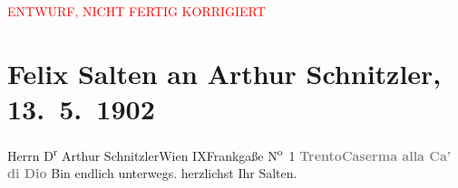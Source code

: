 
\begin{center}
            \textcolor{red}{ENTWURF, NICHT FERTIG KORRIGIERT}
                      \end{center}
            
         \renewcommand{\erwaehnteOrte}{Orte: Frankgasse, IX., Alsergrund, Kaserne Ca’ di Dio, Trient, Wien}
         \renewcommand{\erwaehnteWerke}{}
               \section[Felix Salten an Arthur Schnitzler, 13. 5. 1902]{ Felix Salten an Arthur Schnitzler, 13. 5. 1902}\nopagebreak{}\rehead{ }\begin{ledgroupsized}[t]{13cm}\normalsize\beginnumbering \toendnotes[C]{\smallbreak\pagebreak[2]} 
\pstart{}{\pb}Herrn D\textsuperscript{r} Arthur Schnitzler\pend{}\pstart{}Wien IX\pend{}\pstart{}Frankgaße N\textsuperscript{o} 1\pend{}{\bigskip}\pstart
           \noindent{}{\pb}\textcolor{gray}{\textbf{Trento}}\hfill \textcolor{gray}{\textbf{Caserma alla Ca’ di Dio}}\pend
           \pstart
           Bin endlich unterwegs.\pend
           \pstart herzlichst Ihr \spacefill\mbox{Salten.}\pend{}
         
         \endnumbering{}\end{ledgroupsized}\begin{anhang}\end{anhang}\newcommand{\dateiname}{L03329}\newcommand{\titel}{Felix Salten an Arthur Schnitzler, 13. 5. 1902}\newcommand{\editorInnen}{Martin Anton Müller und Laura Untner}
      
